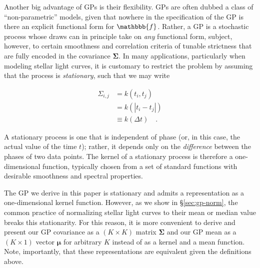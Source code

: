 \documentclass[modern,linenumbers]{aastex62}
\begin{document}
Another big advantage of GPs is their flexibility. GPs are often dubbed
a class of ``non-parametric'' models, given that nowhere in the specification
of the GP is there an explicit functional form for $\mathbbb{f}$. Rather, a GP
is a stochastic
process whose draws can in principle take on \emph{any} functional form,
subject, however, to certain smoothness and correlation criteria
of tunable strictness
that are fully
encoded in the covariance $\pmb{\Sigma}$.
%
In many applications, particularly when modeling stellar light curves,
it is customary to restrict the problem by
assuming that the process is \emph{stationary}, such that we may write
%
\begin{linenomath}\begin{align}
        \label{eq:kernel}
        \Sigma_{i,j} & = k(t_i, t_j)
        \nonumber                                    \\
                     & = k(\left| t_i - t_j \right|)
        \nonumber                                    \\
                     & \equiv k(\Delta t)
        \quad.
    \end{align}\end{linenomath}
%
A stationary process is one that is independent of phase (or, in this case,
the actual value of the time $t$); rather, it depends only on the \emph{difference}
between the phases of two data points. The kernel of a stationary process is
therefore a one-dimensional function, typically chosen from a set of
standard functions with desirable smoothness and spectral properties.

The GP we derive in this paper is stationary and admits a representation
as a one-dimensional kernel function. However, as we show in
\S\ref{sec:gp-norm}, the common practice of normalizing stellar light curves to
their mean or median value breaks this stationarity. For this reason,
it is more convenient to derive and present our GP covariance as a
$(K \times K)$ matrix $\pmb{\Sigma}$ and our GP mean as a
$(K \times 1)$ vector $\pmb{\mu}$ for arbitrary $K$ instead of
as a kernel and a mean function. Note, importantly, that these representations
are equivalent given the definitions above.
\end{document}
